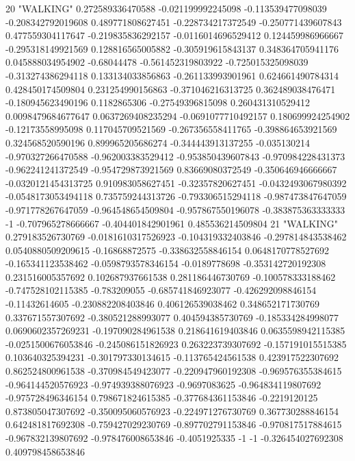 20 "WALKING" 0.272589336470588 -0.021199992245098 -0.113539477098039 -0.208342792019608 0.489771808627451 -0.228734217372549 -0.250771439607843 0.477559304117647 -0.219835836292157 -0.0116014696529412 0.124459986966667 -0.295318149921569 0.128816565005882 -0.305919615843137 0.348364705941176 0.045888034954902 -0.68044478 -0.561452319803922 -0.725015325098039 -0.313274386294118 0.133134033856863 -0.261133993901961 0.624661490784314 0.428450174509804 0.231254990156863 -0.371046216313725 0.362489038476471 -0.180945623490196 0.1182865306 -0.27549396815098 0.260431310529412 0.0098479684677647 0.0637269408235294 -0.0691077710492157 0.180699924254902 -0.12173558995098 0.117045709521569 -0.267356558411765 -0.398864653921569 0.324568520590196 0.899965205686274 -0.344443913137255 -0.035130214 -0.970327266470588 -0.962003383529412 -0.953850439607843 -0.970984228431373 -0.962241241372549 -0.954729873921569 0.83669080372549 -0.350646946666667 -0.0320121454313725 0.910983058627451 -0.32357820627451 -0.0432493067980392 -0.0548173053494118 0.735759244313726 -0.793306515294118 -0.987473847647059 -0.971778267647059 -0.964548654509804 -0.957867550196078 -0.383875363333333 -1 -0.707965278666667 -0.404401842901961 0.485536214509804
21 "WALKING" 0.279183526730769 -0.0181610317526923 -0.104319332403846 -0.297814843538462 0.0540880509209615 -0.16868872575 -0.338632558846154 0.0648170778527692 -0.165341123538462 -0.0598793578346154 -0.0189778698 -0.353142720192308 0.231516005357692 0.102687937661538 0.281186446730769 -0.100578333188462 -0.747528102115385 -0.783209055 -0.685741846923077 -0.426292098846154 -0.11432614605 -0.230882208403846 0.406126539038462 0.348652171730769 0.337671557307692 -0.380521288993077 0.404594385730769 -0.185334284998077 0.0690602357269231 -0.197090284961538 0.218641619403846 0.0635598942115385 -0.0251500676053846 -0.245086151826923 0.263223739307692 -0.157191015515385 0.103640325394231 -0.301797330134615 -0.113765424561538 0.423917522307692 0.862524800961538 -0.370984549423077 -0.220947960192308 -0.969576355384615 -0.964144520576923 -0.974939388076923 -0.9697083625 -0.964834119807692 -0.975728496346154 0.798671824615385 -0.377684361153846 -0.2219120125 0.873805047307692 -0.350095060576923 -0.224971276730769 0.367730288846154 0.642481817692308 -0.759427029230769 -0.897702791153846 -0.970817517884615 -0.967832139807692 -0.978476008653846 -0.4051925335 -1 -1 -0.326454027692308 0.409798458653846
